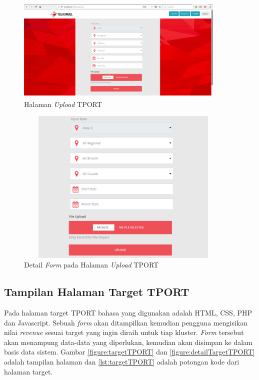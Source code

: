 \begin{figure}[h!]
\centerline
{\includegraphics[width=10cm,height=5cm]{bab5/tampilanUpload.png}}
\caption{Halaman \textit{Upload} TPORT}
\label{figure:uploadTPORT}
\end{figure}

\begin{figure}[h!]
	\centerline
	{\includegraphics[width=10.5cm,height=7.5cm]{bab5/detailTampilanUpload.png}}
	\caption{Detail \textit{Form} pada Halaman \textit{Upload} TPORT}
	\label{figure:detailUploadTPORT}
\end{figure}




\subsection{Tampilan Halaman Target TPORT}
Pada halaman target TPORT bahasa yang digunakan adalah HTML, CSS, PHP dan Javascript. Sebuah \textit{form} akan ditampilkan kemudian pengguna mengisikan nilai \textit{revenue} sesuai target yang ingin diraih untuk tiap kluster. \textit{Form} tersebut akan menampung data-data yang diperlukan, kemudian akan disimpan ke dalam basis data sistem. Gambar \ref{figure:targetTPORT} dan \ref{figure:detailTargetTPORT} adalah tampilan halaman dan \ref{lst:targetTPORT} adalah potongan kode dari halaman target.

